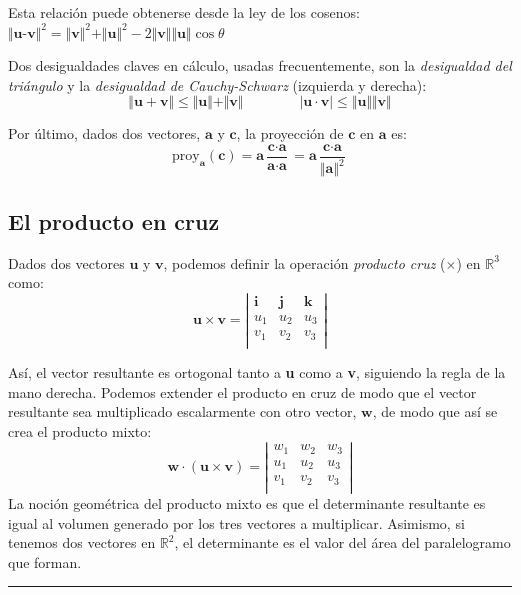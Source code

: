 \documentclass[a4paper]{article}
\begin{document}
Esta relación puede obtenerse desde la ley de los cosenos: $\Vert\textbf{u-v}\Vert^2=\Vert\textbf{v}\Vert^2+\Vert\textbf{u}\Vert^2-2\Vert\textbf{v}\Vert\Vert\textbf{u}\Vert\cos\theta$

Dos desigualdades claves en cálculo, usadas frecuentemente, son la \textit{desigualdad del triángulo} y la \textit{desigualdad de Cauchy-Schwarz} (izquierda y derecha):
\[\Vert\textbf{u}+\textbf{v}\Vert\le\Vert\textbf{u}\Vert+\Vert\textbf{v}\Vert \qquad\qquad |\textbf{u}\cdot\textbf{v}| \le \Vert\textbf{u}\Vert\Vert\textbf{v}\Vert \]

Por último, dados dos vectores, $\textbf{a}$ y $\textbf{c}$, la proyección de $\textbf{c}$ en $\textbf{a}$ es:\[ \text{proy}_\textbf{a}(\textbf{c}) = \textbf{a}\frac{\textbf{c}\cdot\textbf{a}}{\textbf{a}\cdot\textbf{a}} = \textbf{a}\frac{\textbf{c}\cdot\textbf{a}}{\Vert\textbf{a}\Vert^2}\]

\subsection{El producto en cruz}
Dados dos vectores $\textbf{u}$ y $\textbf{v}$, podemos definir la operación \textit{producto cruz} ($\times$) en $\mathbb{R}^3$ como:
\[ \textbf{u} \times \textbf{v} =\left| \begin{matrix}
\textbf{i} & \textbf{j} & \textbf{k}\\
u_1 & u_2 & u_3\\
v_1 & v_2 & v_3\\
\end{matrix}\right| \]

Así, el vector resultante es ortogonal tanto a \textbf{u} como a \textbf{v}, siguiendo la regla de la mano derecha. Podemos extender el producto en cruz de modo que el vector resultante sea multiplicado escalarmente con otro vector, $\textbf{w}$, de modo que así se crea el producto mixto:
\[ \textbf{w}\cdot(\textbf{u} \times \textbf{v}) =\left| \begin{matrix}
w_1 & w_2 & w_3\\
u_1 & u_2 & u_3\\
v_1 & v_2 & v_3\\
\end{matrix}\right| \]
La noción geométrica del producto mixto es que el determinante resultante es igual al volumen generado por los tres vectores a multiplicar. Asimismo, si tenemos dos vectores en $\mathbb{R}^2$, el determinante es el valor del área del paralelogramo que forman.

\rule{\linewidth}{1pt}
\end{document}
